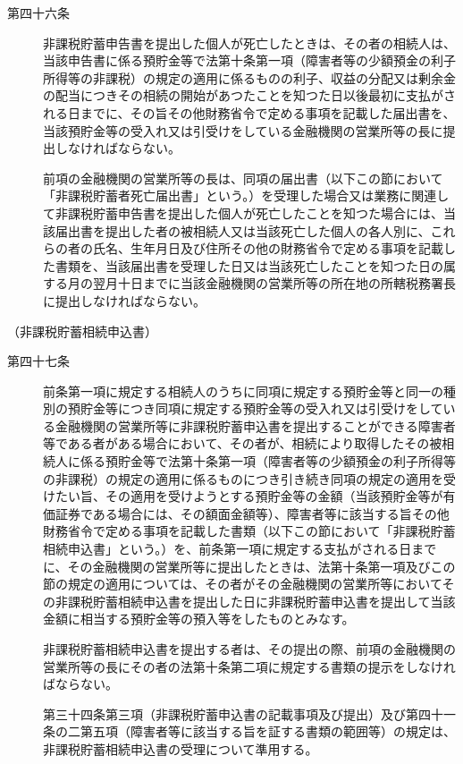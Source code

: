 \documentclass[twocolumn,a4j,10pt]{ltjtarticle}
\begin{document}
\begin{description}
\item[第四十六条]非課税貯蓄申告書を提出した個人が死亡したときは、その者の相続人は、当該申告書に係る預貯金等で法第十条第一項（障害者等の少額預金の利子所得等の非課税）の規定の適用に係るものの利子、収益の分配又は剰余金の配当につきその相続の開始があつたことを知つた日以後最初に支払がされる日までに、その旨その他財務省令で定める事項を記載した届出書を、当該預貯金等の受入れ又は引受けをしている金融機関の営業所等の長に提出しなければならない。
\item[]前項の金融機関の営業所等の長は、同項の届出書（以下この節において「非課税貯蓄者死亡届出書」という。）を受理した場合又は業務に関連して非課税貯蓄申告書を提出した個人が死亡したことを知つた場合には、当該届出書を提出した者の被相続人又は当該死亡した個人の各人別に、これらの者の氏名、生年月日及び住所その他の財務省令で定める事項を記載した書類を、当該届出書を受理した日又は当該死亡したことを知つた日の属する月の翌月十日までに当該金融機関の営業所等の所在地の所轄税務署長に提出しなければならない。
\end{description}
\noindent\hspace{10pt}（非課税貯蓄相続申込書）
\begin{description}
\item[第四十七条]前条第一項に規定する相続人のうちに同項に規定する預貯金等と同一の種別の預貯金等につき同項に規定する預貯金等の受入れ又は引受けをしている金融機関の営業所等に非課税貯蓄申込書を提出することができる障害者等である者がある場合において、その者が、相続により取得したその被相続人に係る預貯金等で法第十条第一項（障害者等の少額預金の利子所得等の非課税）の規定の適用に係るものにつき引き続き同項の規定の適用を受けたい旨、その適用を受けようとする預貯金等の金額（当該預貯金等が有価証券である場合には、その額面金額等）、障害者等に該当する旨その他財務省令で定める事項を記載した書類（以下この節において「非課税貯蓄相続申込書」という。）を、前条第一項に規定する支払がされる日までに、その金融機関の営業所等に提出したときは、法第十条第一項及びこの節の規定の適用については、その者がその金融機関の営業所等においてその非課税貯蓄相続申込書を提出した日に非課税貯蓄申込書を提出して当該金額に相当する預貯金等の預入等をしたものとみなす。
\item[]非課税貯蓄相続申込書を提出する者は、その提出の際、前項の金融機関の営業所等の長にその者の法第十条第二項に規定する書類の提示をしなければならない。
\item[]第三十四条第三項（非課税貯蓄申込書の記載事項及び提出）及び第四十一条の二第五項（障害者等に該当する旨を証する書類の範囲等）の規定は、非課税貯蓄相続申込書の受理について準用する。
\end{description}
\end{document}
